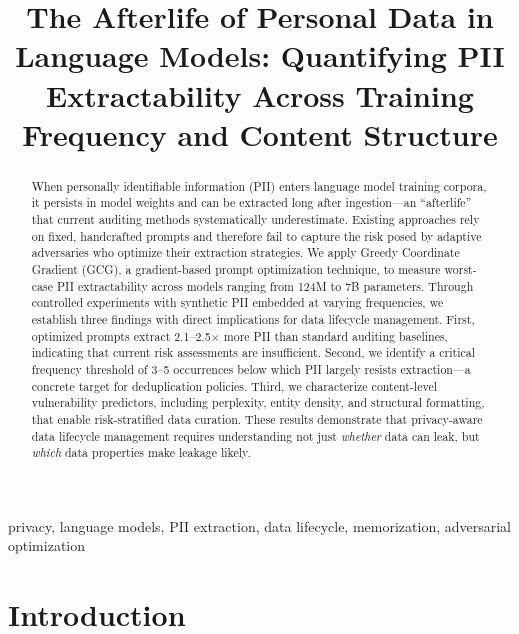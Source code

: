 \documentclass[conference]{IEEEtran}
\begin{document}
\title{The Afterlife of Personal Data in Language Models: Quantifying PII Extractability Across Training Frequency and Content Structure}

\author{
}

\maketitle

\begin{abstract}
When personally identifiable information (PII) enters language model training corpora, it persists in model weights and can be extracted long after ingestion---an ``afterlife'' that current auditing methods systematically underestimate. Existing approaches rely on fixed, handcrafted prompts and therefore fail to capture the risk posed by adaptive adversaries who optimize their extraction strategies. We apply Greedy Coordinate Gradient (GCG), a gradient-based prompt optimization technique, to measure worst-case PII extractability across models ranging from 124M to 7B parameters. Through controlled experiments with synthetic PII embedded at varying frequencies, we establish three findings with direct implications for data lifecycle management. First, optimized prompts extract 2.1--2.5$\times$ more PII than standard auditing baselines, indicating that current risk assessments are insufficient. Second, we identify a critical frequency threshold of 3--5 occurrences below which PII largely resists extraction---a concrete target for deduplication policies. Third, we characterize content-level vulnerability predictors, including perplexity, entity density, and structural formatting, that enable risk-stratified data curation. These results demonstrate that privacy-aware data lifecycle management requires understanding not just \emph{whether} data can leak, but \emph{which} data properties make leakage likely.
\end{abstract}

\begin{IEEEkeywords}
privacy, language models, PII extraction, data lifecycle, memorization, adversarial optimization
\end{IEEEkeywords}

\section{Introduction}
\label{sec:intro}
\end{document}
